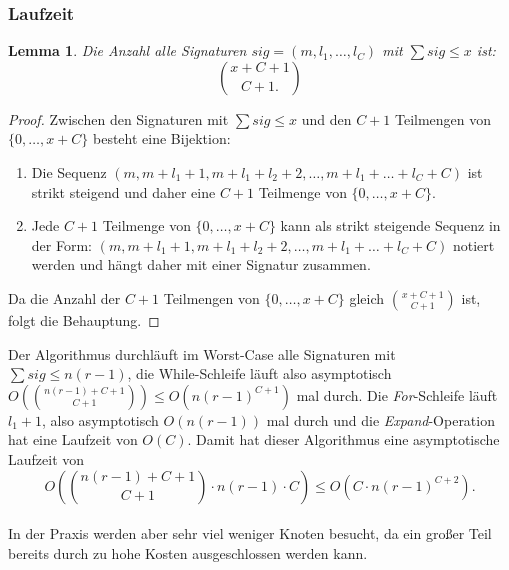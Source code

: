 \documentclass[a4paper,10pt,ngerman]{scrartcl}
\newtheorem{lemma}[satz]{Lemma}
\begin{document}
    \subsubsection{Laufzeit}
    \begin{lemma}
        \label{lem:chooose}
        Die Anzahl alle Signaturen $sig = (m, l_1, \dots, l_C)$ mit $\sum sig \le x$ ist: \[{x + C + 1} \choose {C+1}.\]
    \end{lemma}
    \begin{proof}
        Zwischen den Signaturen mit $\sum sig \le x$ und den $C+1$ Teilmengen von $\{0, \dots, x + C\}$ besteht eine Bijektion:
        \begin{enumerate}
            \item Die Sequenz $(m, m + l_1 + 1, m + l_1 + l_2 + 2, \dots, m + l_1 + \dots + l_C + C)$ ist strikt steigend und daher eine $C+1$ Teilmenge von $\{0, \dots, x + C\}$.

            \item Jede $C+1$ Teilmenge von $\{0, \dots, x + C\}$ kann als strikt steigende Sequenz in der Form: $(m, m + l_1 + 1, m + l_1 + l_2 + 2, \dots, m + l_1 + \dots + l_C + C)$ notiert werden und hängt daher mit einer Signatur zusammen.
        \end{enumerate}
        Da die Anzahl der $C+1$ Teilmengen von $\{0, \dots, x + C\}$ gleich ${x + C + 1} \choose {C+1}$ ist, folgt die Behauptung.
    \end{proof}
    Der Algorithmus durchläuft im Worst-Case alle Signaturen mit $\sum sig \le n (r - 1)$, die While-Schleife läuft also asymptotisch $O\left({{n(r-1) + C + 1} \choose {C+1}}\right) \le O(n(r-1)^{C+1})$ mal durch.
    Die \textit{For}-Schleife läuft $l_1 + 1$, also asymptotisch $O(n(r-1))$ mal durch und die \textit{Expand}-Operation hat eine Laufzeit von $O(C)$.
    Damit hat dieser Algorithmus eine asymptotische Laufzeit von \[O \left({{n(r-1) + C + 1} \choose {C+1}} \cdot n(r-1) \cdot C \right) \le O\left(C \cdot n(r-1)^{C+2}\right).\] \\
    In der Praxis werden aber sehr viel weniger Knoten besucht, da ein großer Teil bereits durch zu hohe Kosten ausgeschlossen werden kann.
\end{document}
